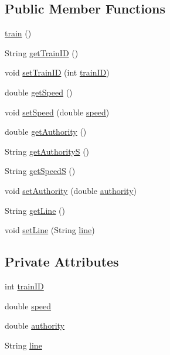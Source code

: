 \subsection*{Public Member Functions}
\begin{DoxyCompactItemize}
\item 
\hyperlink{classtrain_ab59e6329c64e077e362640c3c1efd4e3}{train} ()
\item 
String \hyperlink{classtrain_a15b117ba7a9fe96a1713393316884184}{get\+Train\+ID} ()
\item 
void \hyperlink{classtrain_aca453b158d99ac2c56ac31fbd6d23b64}{set\+Train\+ID} (int \hyperlink{classtrain_afd48feba85a8c5bce2fcab13f8e5f709}{train\+ID})
\item 
double \hyperlink{classtrain_add82fa33c54bc9be71bbabb9df4980b4}{get\+Speed} ()
\item 
void \hyperlink{classtrain_aa655ee4487d9476b21faab1e71d816f9}{set\+Speed} (double \hyperlink{classtrain_aae9db61086b60cf549586993da5a29dd}{speed})
\item 
double \hyperlink{classtrain_adaa613d6d0407c1bc75286433ee4492c}{get\+Authority} ()
\item 
String \hyperlink{classtrain_ae60270a74c0afa8710a412d9ddb5c512}{get\+AuthorityS} ()
\item 
String \hyperlink{classtrain_a77ed94ef8762ffab78076216a54d7072}{get\+SpeedS} ()
\item 
void \hyperlink{classtrain_a4fd252f0677dfd05cdbb0dfac79477d1}{set\+Authority} (double \hyperlink{classtrain_ad627ddd59fd3a4e24fd20fbeae490ad6}{authority})
\item 
String \hyperlink{classtrain_a1e506c38b86f07589e8ebe433674d7db}{get\+Line} ()
\item 
void \hyperlink{classtrain_a0c64747d8c11a6b68d802c4159d2911c}{set\+Line} (String \hyperlink{classtrain_a0c5c46d048165fc94a8c259b953ca844}{line})
\end{DoxyCompactItemize}
\subsection*{Private Attributes}
\begin{DoxyCompactItemize}
\item 
int \hyperlink{classtrain_afd48feba85a8c5bce2fcab13f8e5f709}{train\+ID}
\item 
double \hyperlink{classtrain_aae9db61086b60cf549586993da5a29dd}{speed}
\item 
double \hyperlink{classtrain_ad627ddd59fd3a4e24fd20fbeae490ad6}{authority}
\item 
String \hyperlink{classtrain_a0c5c46d048165fc94a8c259b953ca844}{line}
\end{DoxyCompactItemize}



